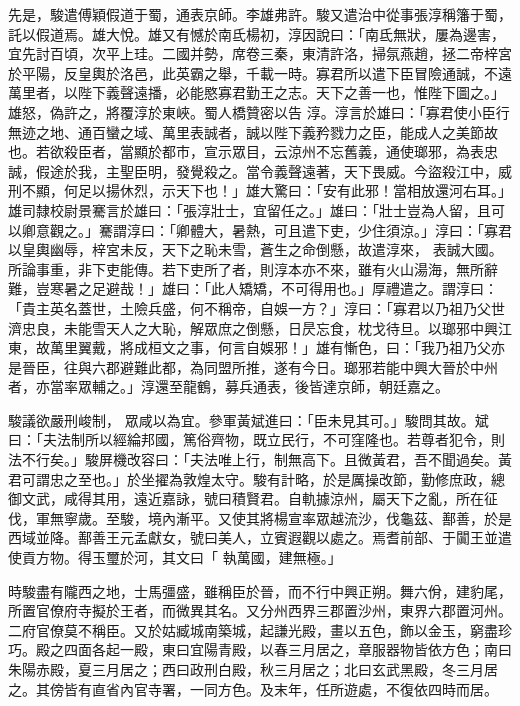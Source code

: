 \begin{pinyinscope}
 先是，駿遣傅穎假道于蜀，通表京師。李雄弗許。駿又遣治中從事張淳稱籓于蜀，託以假道焉。雄大悅。雄又有憾於南氐楊初，淳因說曰：「南氐無狀，屢為邊害，宜先討百頃，次平上珪。二國并勢，席卷三秦，東清許洛，掃氛燕趙，拯二帝梓宮於平陽，反皇輿於洛邑，此英霸之舉，千載一時。寡君所以遣下臣冒險通誠，不遠萬里者，以陛下義聲遠播，必能愍寡君勤王之志。天下之善一也，惟陛下圖之。」雄怒，偽許之，將覆淳於東峽。蜀人橋贊密以告
 淳。淳言於雄曰：「寡君使小臣行無迹之地、通百蠻之域、萬里表誠者，誠以陛下義矜戮力之臣，能成人之美節故也。若欲殺臣者，當顯於都市，宣示眾目，云涼州不忘舊義，通使瑯邪，為表忠誠，假途於我，主聖臣明，發覺殺之。當令義聲遠著，天下畏威。今盜殺江中，威刑不顯，何足以揚休烈，示天下也！」雄大驚曰：「安有此邪！當相放還河右耳。」雄司隸校尉景騫言於雄曰：「張淳壯士，宜留任之。」雄曰：「壯士豈為人留，且可以卿意觀之。」騫謂淳曰：「卿體大，暑熱，可且遣下吏，少住須涼。」淳曰：「寡君以皇輿幽辱，梓宮未反，天下之恥未雪，蒼生之命倒懸，故遣淳來，
 表誠大國。所論事重，非下吏能傳。若下吏所了者，則淳本亦不來，雖有火山湯海，無所辭難，豈寒暑之足避哉！」雄曰：「此人矯矯，不可得用也。」厚禮遣之。謂淳曰：「貴主英名蓋世，土險兵盛，何不稱帝，自娛一方？」淳曰：「寡君以乃祖乃父世濟忠良，未能雪天人之大恥，解眾庶之倒懸，日昃忘食，枕戈待旦。以瑯邪中興江東，故萬里翼戴，將成桓文之事，何言自娛邪！」雄有慚色，曰：「我乃祖乃父亦是晉臣，往與六郡避難此都，為同盟所推，遂有今日。瑯邪若能中興大晉於中州者，亦當率眾輔之。」淳還至龍鶴，募兵通表，後皆達京師，朝廷嘉之。



 駿議欲嚴刑峻制，
 眾咸以為宜。參軍黃斌進曰：「臣未見其可。」駿問其故。斌曰：「夫法制所以經綸邦國，篤俗齊物，既立民行，不可窪隆也。若尊者犯令，則法不行矣。」駿屏機改容曰：「夫法唯上行，制無高下。且微黃君，吾不聞過矣。黃君可謂忠之至也。」於坐擢為敦煌太守。駿有計略，於是厲操改節，勤修庶政，總御文武，咸得其用，遠近嘉詠，號曰積賢君。自軌據涼州，屬天下之亂，所在征伐，軍無寧歲。至駿，境內漸平。又使其將楊宣率眾越流沙，伐龜茲、鄯善，於是西域並降。鄯善王元孟獻女，號曰美人，立賓遐觀以處之。焉耆前部、于闐王並遣使貢方物。得玉璽於河，其文曰「
 執萬國，建無極。」



 時駿盡有隴西之地，士馬彊盛，雖稱臣於晉，而不行中興正朔。舞六佾，建豹尾，所置官僚府寺擬於王者，而微異其名。又分州西界三郡置沙州，東界六郡置河州。二府官僚莫不稱臣。又於姑臧城南築城，起謙光殿，畫以五色，飾以金玉，窮盡珍巧。殿之四面各起一殿，東曰宜陽青殿，以春三月居之，章服器物皆依方色；南曰朱陽赤殿，夏三月居之；西曰政刑白殿，秋三月居之；北曰玄武黑殿，冬三月居之。其傍皆有直省內官寺署，一同方色。及末年，任所遊處，不復依四時而居。




\end{pinyinscope}
